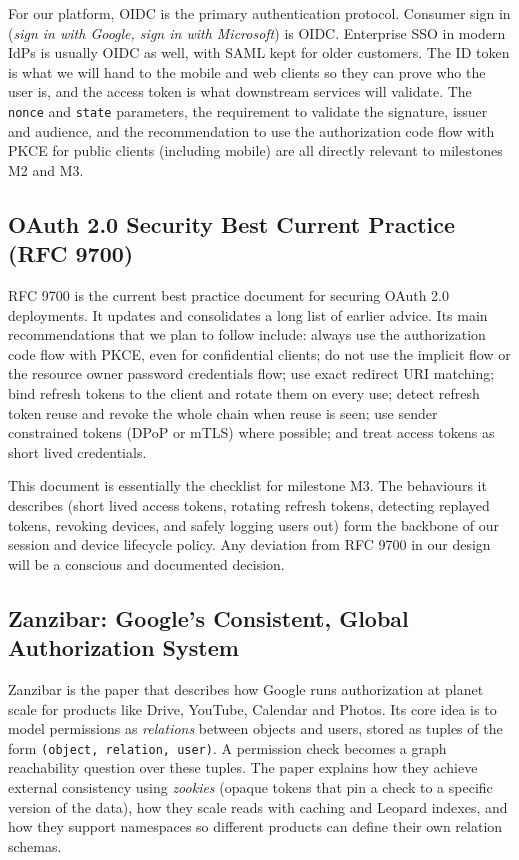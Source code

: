 \documentclass[11pt,a4paper]{article}
\begin{document}
For our platform, OIDC is the primary authentication protocol. Consumer sign in (\textit{sign in with Google, sign in with Microsoft}) is OIDC. Enterprise SSO in modern IdPs is usually OIDC as well, with SAML kept for older customers. The ID token is what we will hand to the mobile and web clients so they can prove who the user is, and the access token is what downstream services will validate. The \texttt{nonce} and \texttt{state} parameters, the requirement to validate the signature, issuer and audience, and the recommendation to use the authorization code flow with PKCE for public clients (including mobile) are all directly relevant to milestones M2 and M3.

\subsection{OAuth 2.0 Security Best Current Practice (RFC 9700)}

RFC 9700 is the current best practice document for securing OAuth 2.0 deployments. It updates and consolidates a long list of earlier advice. Its main recommendations that we plan to follow include: always use the authorization code flow with PKCE, even for confidential clients; do not use the implicit flow or the resource owner password credentials flow; use exact redirect URI matching; bind refresh tokens to the client and rotate them on every use; detect refresh token reuse and revoke the whole chain when reuse is seen; use sender constrained tokens (DPoP or mTLS) where possible; and treat access tokens as short lived credentials.

This document is essentially the checklist for milestone M3. The behaviours it describes (short lived access tokens, rotating refresh tokens, detecting replayed tokens, revoking devices, and safely logging users out) form the backbone of our session and device lifecycle policy. Any deviation from RFC 9700 in our design will be a conscious and documented decision.

\subsection{Zanzibar: Google's Consistent, Global Authorization System}

Zanzibar is the paper that describes how Google runs authorization at planet scale for products like Drive, YouTube, Calendar and Photos. Its core idea is to model permissions as \textit{relations} between objects and users, stored as tuples of the form \texttt{(object, relation, user)}. A permission check becomes a graph reachability question over these tuples. The paper explains how they achieve external consistency using \textit{zookies} (opaque tokens that pin a check to a specific version of the data), how they scale reads with caching and Leopard indexes, and how they support namespaces so different products can define their own relation schemas.
\end{document}

